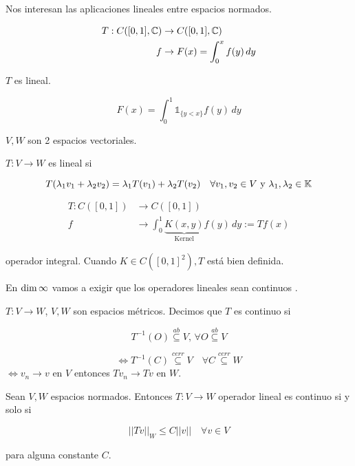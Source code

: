 Nos interesan las aplicaciones lineales entre espacios normados.

\begin{fexample}
    \begin{align*}T:C([0,1],\mathbb{C})&\to C([0,1],\mathbb{C})\\
    f&\to F(x)=\int_0^x f(y)\, dy\end{align*}

    $T$ es lineal.

    \[F(x)=\int_0^1 \mathds{1}_{\{y<x\}} f(y)\,dy\]
\end{fexample}

\begin{fdefinition}
    $V,W$ son 2 espacios vectoriales.

    $T:V\to W$ es lineal si 

    \[T(\lambda_1 v_1+\lambda_2 v_2)=\lambda_1 T(v_1)+\lambda_2 T(v_2)\quad \forall v_1,v_2\in V\text{ y } \lambda_1,\lambda_2\in \mathbb{K}\]

\end{fdefinition}

\begin{align*}T:C([0,1])&\to C([0,1])\\
f&\to \int_0^1 \underbrace{K(x,y)}_{\text{Kernel}} f(y)\,dy:=Tf(x)\end{align*}

operador integral. Cuando $K\in C([0,1]^2), T$ está bien definida.

En $\operatorname{dim} \infty$ vamos a exigir que los operadores lineales sean \color{red} continuos \color{black}.

\begin{fdefinition}
    $T:V\to W$, $V,W$ son espacios métricos. Decimos que $T$ es continuo si
    
    \[T^{-1}(O)\overset{ab}{\subseteq} V,\, \forall O\overset{ab}{\subseteq} V\]

    \[\iff T^{-1}(C)\overset{cerr}{\subseteq} V\quad \forall C\overset{cerr}{\subseteq} W\]
    $\iff v_n\to v$ en $V$ entonces $Tv_n\to Tv$ en $W$.
\end{fdefinition}

\begin{ftheorem}
    Sean $V,W$ espacios normados. Entonces $T:V\to W$ operador lineal es continuo si y solo si

    \begin{equation}||Tv||_W\leq C||v||\quad \forall v\in V\end{equation}

    para alguna constante $C$.
\end{ftheorem}

